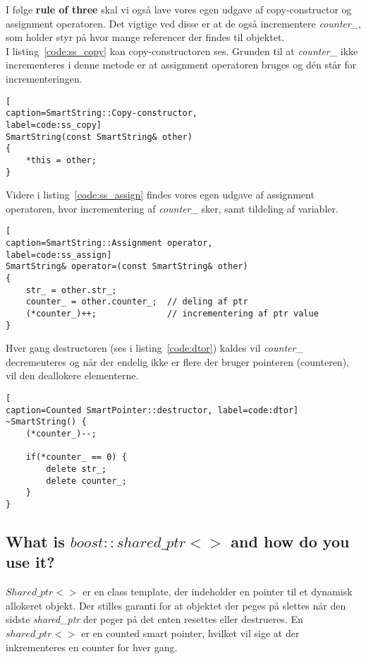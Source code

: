 I følge \textbf{rule of three} skal vi også lave vores egen udgave af copy-constructor og assignment operatoren.
Det vigtige ved disse er at de også incrementere \textit{counter\_}, som holder styr på hvor mange referencer der findes til objektet.\\

I listing~\ref{code:ss_copy} kan copy-constructoren ses. Grunden til at \textit{counter\_} ikke incrementeres i denne metode er at assignment operatoren bruges og dén står for incrementeringen. 

\begin{lstlisting}[
caption=SmartString::Copy-constructor, 
label=code:ss_copy]
SmartString(const SmartString& other)
{
	*this = other;
}
\end{lstlisting}

Videre i listing~\ref{code:ss_assign} findes vores egen udgave af assignment operatoren, hvor incrementering af \textit{counter\_} sker, samt tildeling af variabler.

\begin{lstlisting}[
caption=SmartString::Assignment operator,
label=code:ss_assign]
SmartString& operator=(const SmartString& other)
{
	str_ = other.str_;
	counter_ = other.counter_;	// deling af ptr
	(*counter_)++;				// incrementering af ptr value
}
\end{lstlisting}

Hver gang destructoren (ses i listing~\ref{code:dtor}) kaldes vil \textit{counter\_} decrementeres og når der endelig ikke er flere der bruger pointeren (counteren), vil den deallokere elementerne.

\begin{lstlisting}[
caption=Counted SmartPointer::destructor, label=code:dtor]
~SmartString() {
	(*counter_)--;

	if(*counter_ == 0) {
		delete str_;
		delete counter_;
	}
}
\end{lstlisting}

\subsection{What is $boost::shared\_ptr<>$ and how do you use it?}

$Shared\_ptr<>$ er en class template, der indeholder en pointer til et dynamisk allokeret objekt. Der stilles garanti for at objektet der peges på slettes når den sidste \textit{shared\_ptr} der peger på det enten resettes eller destrueres. En $shared\_ptr<>$ er en counted smart pointer, hvilket vil sige at der inkrementeres en counter for hver gang.

